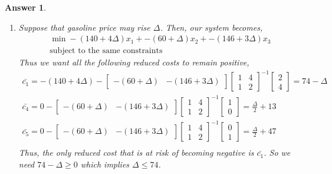 \documentclass[12pt]{article}
\theoremstyle{colon}
\newtheorem*{answer}{Answer}
\begin{document}
\begin{answer}
\begin{enumerate}[label=\arabic*)]
\begin{gather*}
      \end{gather*}
      All positive, so the BFS $x_2 = 2000000, x_3 = 1500000, x_1=s_1=s_2=0$ is the optimal solution. The objective value is 339000000.
    \item Suppose that gasoline price may rise $\Delta$. Then, our system becomes,
      \begin{gather*}
        \min -(140+4\Delta)x_1 + -(60+\Delta)x_2 + -(146+3\Delta)x_3 \\
        \text{subject to the same constraints}
      \end{gather*}
      Thus we want all the following reduced costs to remain positive,
      \begin{gather*}
        \bar{c_1} = -(140+4\Delta) - \begin{bmatrix} -(60+\Delta) & -(146+3\Delta) \end{bmatrix}\begin{bmatrix}
          1 & 4 \\
          1 & 2
        \end{bmatrix}^{-1} \begin{bmatrix} 2 \\ 4 \end{bmatrix} = 74 - \Delta \\
        \bar{c_4} = 0 - \begin{bmatrix} -(60+\Delta) & -(146+3\Delta) \end{bmatrix}\begin{bmatrix}
          1 & 4 \\
          1 & 2
        \end{bmatrix}^{-1} \begin{bmatrix} 1 \\ 0 \end{bmatrix} = \frac{\Delta}{2} + 13 \\
        \bar{c_5} = 0 - \begin{bmatrix} -(60+\Delta) & -(146+3\Delta) \end{bmatrix}\begin{bmatrix}
          1 & 4 \\
          1 & 2
        \end{bmatrix}^{-1} \begin{bmatrix} 0 \\ 1 \end{bmatrix} = \frac{\Delta}{2} + 47 \\
      \end{gather*}
      Thus, the only reduced cost that is at risk of becoming negative is $\bar{c_1}$. So we need $74 - \Delta \geq 0$ which implies $\Delta \leq 74$.

\end{enumerate}
\end{answer}
\end{document}
